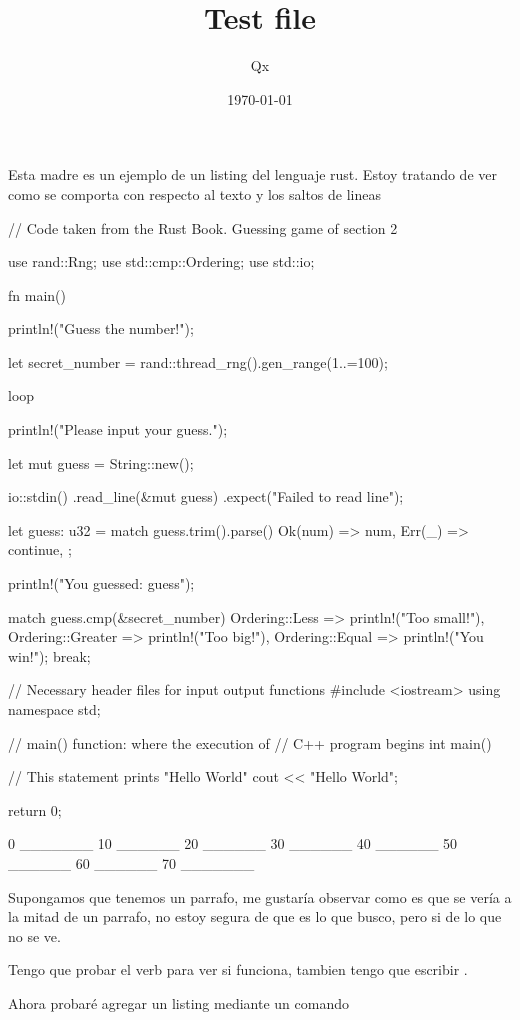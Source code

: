 \documentclass[pagecolor=true, pagesize=a5paper, stretchmode]{qx-files/qx-notes}
\title{Test file}
\author{Qx}
\date{\today}
\begin{document}
  \maketitle

  Esta madre es un ejemplo de un listing del lenguaje rust. Estoy tratando de ver
  como se comporta con respecto al texto y los saltos de lineas

  \begin{codeblock}
    // Code taken from the Rust Book. Guessing game of section 2

    use rand::Rng;
    use std::cmp::Ordering;
    use std::io;

    fn main() {
      println!("Guess the number!");

      let secret_number = rand::thread_rng().gen_range(1..=100);

      loop {
        println!("Please input your guess.");

        let mut guess = String::new();

        io::stdin()
            .read_line(&mut guess)
            .expect("Failed to read line");

        let guess: u32 = match guess.trim().parse() {
          Ok(num) => num,
          Err(_) => continue,
        };

        println!("You guessed: {guess}");

        match guess.cmp(&secret_number) {
          Ordering::Less => println!("Too small!"),
          Ordering::Greater => println!("Too big!"),
          Ordering::Equal => {
            println!("You win!");
            break;
          }
        }
      }
    }
  \end{codeblock}

  \begin{codeblock}[c++]
    // Necessary header files for input output functions
    #include <iostream>
    using namespace std;

    // main() function: where the execution of
    // C++ program begins
    int main() {
      
        // This statement prints "Hello World"
        cout << "Hello World";

        return 0;
    }
  \end{codeblock}


  \begin{verbblock}
    0 _______ 10 ______ 20 ______ 30 ______ 40 ______ 50 ______ 60 ______ 70 _______
  \end{verbblock}

  Supongamos que tenemos un parrafo, me gustaría observar como es que
   se vería a la mitad de un parrafo, no estoy segura de que es lo que busco, pero si de lo que no se ve.
  
  Tengo que probar el verb  para ver si funciona, tambien tengo que 
  escribir .

  Ahora probaré agregar un listing mediante un comando

\end{document}
